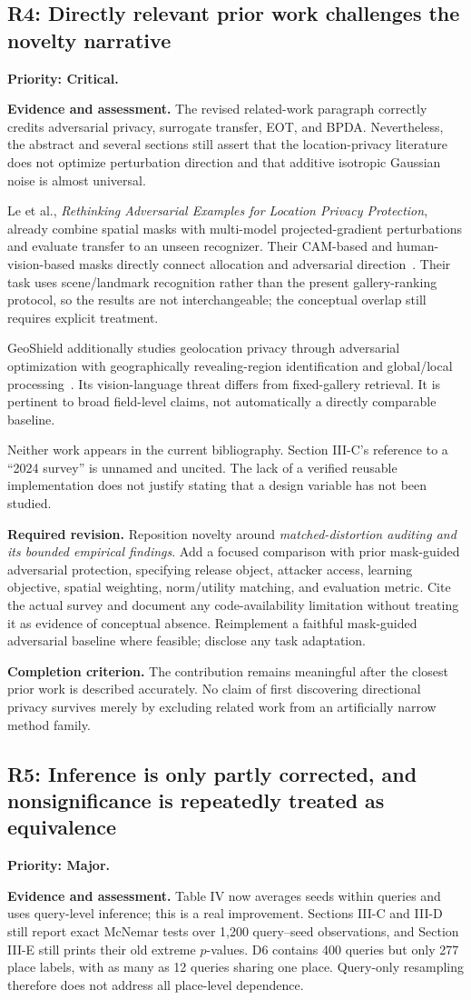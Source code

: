 \documentclass[11pt,a4paper]{article}
\newcommand{\finding}[3]{\subsection{#1: #3}\label{rev:#1}\textbf{Priority: #2.}}
\newcommand{\evidence}{\par\textbf{Evidence and assessment.} }
\newcommand{\action}{\par\textbf{Required revision.} }
\newcommand{\acceptance}{\par\textbf{Completion criterion.} }
\begin{document}
\finding{R4}{Critical}{Directly relevant prior work challenges the novelty narrative}
\evidence
The revised related-work paragraph correctly credits adversarial privacy, surrogate transfer, EOT, and BPDA. Nevertheless, the abstract and several sections still assert that the location-privacy literature does not optimize perturbation direction and that additive isotropic Gaussian noise is almost universal.

Le et al., \emph{Rethinking Adversarial Examples for Location Privacy Protection}, already combine spatial masks with multi-model projected-gradient perturbations and evaluate transfer to an unseen recognizer. Their CAM-based and human-vision-based masks directly connect allocation and adversarial direction~\cite{le2022}. Their task uses scene/landmark recognition rather than the present gallery-ranking protocol, so the results are not interchangeable; the conceptual overlap still requires explicit treatment.

GeoShield additionally studies geolocation privacy through adversarial optimization with geographically revealing-region identification and global/local processing~\cite{geoshield}. Its vision-language threat differs from fixed-gallery retrieval. It is pertinent to broad field-level claims, not automatically a directly comparable baseline.

Neither work appears in the current bibliography. Section III-C's reference to a ``2024 survey'' is unnamed and uncited. The lack of a verified reusable implementation does not justify stating that a design variable has not been studied.

\action
Reposition novelty around \emph{matched-distortion auditing and its bounded empirical findings}. Add a focused comparison with prior mask-guided adversarial protection, specifying release object, attacker access, learning objective, spatial weighting, norm/utility matching, and evaluation metric. Cite the actual survey and document any code-availability limitation without treating it as evidence of conceptual absence. Reimplement a faithful mask-guided adversarial baseline where feasible; disclose any task adaptation.
\acceptance
The contribution remains meaningful after the closest prior work is described accurately. No claim of first discovering directional privacy survives merely by excluding related work from an artificially narrow method family.

\finding{R5}{Major}{Inference is only partly corrected, and nonsignificance is repeatedly treated as equivalence}
\evidence
Table IV now averages seeds within queries and uses query-level inference; this is a real improvement. Sections III-C and III-D still report exact McNemar tests over 1,200 query--seed observations, and Section III-E still prints their old extreme $p$-values. D6 contains 400 queries but only 277 place labels, with as many as 12 queries sharing one place. Query-only resampling therefore does not address all place-level dependence.
\end{document}
